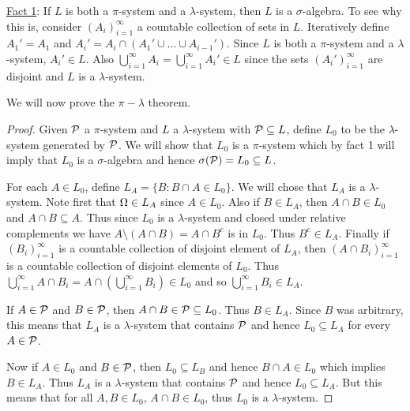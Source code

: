 \underline{Fact 1}: If $L$ is both a $\pi$-system and a $\lambda$-system, then $L$ is a $\sigma$-algebra. To see why this is, consider $(A_i)_{i=1}^\infty$ a countable collection of sets in $L$. Iteratively define $A_1'=A_1$ and $A_i' = A_i \cap (A_1'\cup\ldots \cup A_{i-1}')$. Since $L$ is both a $\pi$-system and a $\lambda$-system, $A_i' \in L$. Also $\bigcup_{i=1}^\infty A_i = \bigcup_{i=1}^\infty A_i' \in L$ since the sets $(A_i')_{i=1}^\infty$ are disjoint and $L$ is a $\lambda$-system. 

We will now prove the $\pi - \lambda$ theorem.
\begin{proof}
    Given ${\mathcal{P}}$ a $\pi$-system and $L$ a $\lambda$-system with ${\mathcal{P}} \subseteq L$, define $L_0$ to be the $\lambda$-system generated by ${\mathcal{P}}$. We will show that $L_0$ is a $\pi$-system which by fact 1 will imply that $L_0$ is a $\sigma$-algebra and hence $\sigma({\mathcal{P}}) = L_0 \subseteq L$.

    For each $A \in L_0$, define $L_A = \{B : B \cap A \in L_0\}$. We will chose that $L_A$ is a $\lambda$-system. Note first that ${{\Omega}} \in L_A$ since $A \in L_0$. Also if $B \in L_A$, then $A \cap B \in L_0$ and $A \cap B \subseteq A$. Thus since $L_0$ is a $\lambda$-system and closed under relative complements we have $A \setminus (A \cap B) = A \cap B^c$ is in $L_0$. Thus $B^c \in L_A$. Finally if $(B_i)_{i=1}^\infty$ is a countable collection of disjoint element of $L_A$, then $(A \cap B_i)_{i=1}^\infty$ is a countable collection of disjoint elements of $L_0$. Thus $\bigcup_{i=1}^\infty A \cap B_i = A \cap \left(\bigcup_{i=1}^\infty B_i \right) \in L_0$ and so $\bigcup_{i=1}^\infty B_i \in L_A$.

    If $A \in {\mathcal{P}}$ and $B \in {\mathcal{P}}$, then $A \cap B \in {\mathcal{P}} \subseteq L_0$. Thus $B \in L_A$. Since $B$ was arbitrary, this means that $L_A$ is a $\lambda$-system that contains ${\mathcal{P}}$ and hence $L_0 \subseteq L_A$ for every $A \in {\mathcal{P}}$.

    Now if $A \in L_0$ and $B \in {\mathcal{P}}$, then $L_0 \subseteq L_B$ and hence $B \cap A \in L_0$ which implies $B \in L_A$. Thus $L_A$ is a $\lambda$-system that contains ${\mathcal{P}}$ and hence $L_0 \subseteq L_A$. But this means that for all $A,B \in L_0$, $A\cap B \in L_0$, thus $L_0$ is a $\lambda$-system.
\end{proof}
